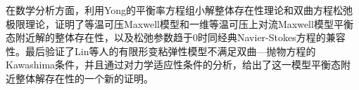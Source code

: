 \begin{cabstract}
在数学分析方面，利用Yong的平衡率方程组小解整体存在性理论和双曲方程松弛极限理论，证明了等温可压Maxwell模型和一维等温可压上对流Maxwell模型平衡态附近解的整体存在性，以及松弛参数趋于$0$时同经典Navier-Stokes方程的兼容性。最后验证了Lin等人的有限形变粘弹性模型不满足双曲—抛物方程的Kawashima条件，并且通过对力学适应性条件的分析，给出了这一模型平衡态附近整体解存在性的一个新的证明。



\end{cabstract}

